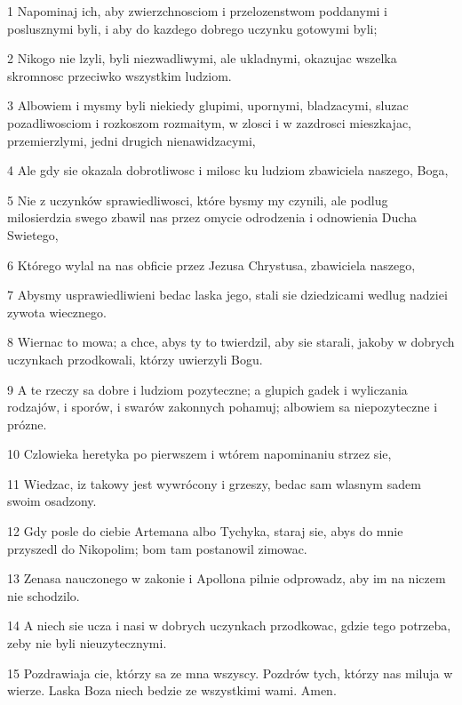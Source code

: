 \par 1 Napominaj ich, aby zwierzchnosciom i przelozenstwom poddanymi i poslusznymi byli, i aby do kazdego dobrego uczynku gotowymi byli;
\par 2 Nikogo nie lzyli, byli niezwadliwymi, ale ukladnymi, okazujac wszelka skromnosc przeciwko wszystkim ludziom.
\par 3 Albowiem i mysmy byli niekiedy glupimi, upornymi, bladzacymi, sluzac pozadliwosciom i rozkoszom rozmaitym, w zlosci i w zazdrosci mieszkajac, przemierzlymi, jedni drugich nienawidzacymi,
\par 4 Ale gdy sie okazala dobrotliwosc i milosc ku ludziom zbawiciela naszego, Boga,
\par 5 Nie z uczynków sprawiedliwosci, które bysmy my czynili, ale podlug milosierdzia swego zbawil nas przez omycie odrodzenia i odnowienia Ducha Swietego,
\par 6 Którego wylal na nas obficie przez Jezusa Chrystusa, zbawiciela naszego,
\par 7 Abysmy usprawiedliwieni bedac laska jego, stali sie dziedzicami wedlug nadziei zywota wiecznego.
\par 8 Wiernac to mowa; a chce, abys ty to twierdzil, aby sie starali, jakoby w dobrych uczynkach przodkowali, którzy uwierzyli Bogu.
\par 9 A te rzeczy sa dobre i ludziom pozyteczne; a glupich gadek i wyliczania rodzajów, i sporów, i swarów zakonnych pohamuj; albowiem sa niepozyteczne i prózne.
\par 10 Czlowieka heretyka po pierwszem i wtórem napominaniu strzez sie,
\par 11 Wiedzac, iz takowy jest wywrócony i grzeszy, bedac sam wlasnym sadem swoim osadzony.
\par 12 Gdy posle do ciebie Artemana albo Tychyka, staraj sie, abys do mnie przyszedl do Nikopolim; bom tam postanowil zimowac.
\par 13 Zenasa nauczonego w zakonie i Apollona pilnie odprowadz, aby im na niczem nie schodzilo.
\par 14 A niech sie ucza i nasi w dobrych uczynkach przodkowac, gdzie tego potrzeba, zeby nie byli nieuzytecznymi.
\par 15 Pozdrawiaja cie, którzy sa ze mna wszyscy. Pozdrów tych, którzy nas miluja w wierze. Laska Boza niech bedzie ze wszystkimi wami. Amen.


